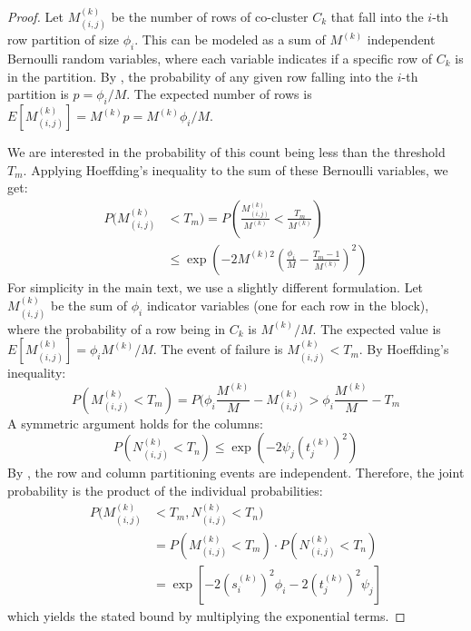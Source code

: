 \documentclass[journal]{IEEEtran}
\theoremstyle{definition}
\theoremstyle{remark} %
\begin{document}
{\color{blue}
\begin{proof}
    Let $M_{(i,j)}^{(k)}$ be the number of rows of co-cluster $C_k$ that fall into the $i$-th row partition of size $\phi_i$. This can be modeled as a sum of $M^{(k)}$ independent Bernoulli random variables, where each variable indicates if a specific row of $C_k$ is in the partition. By , the probability of any given row falling into the $i$-th partition is $p = \phi_i / M$. The expected number of rows is $E[M_{(i,j)}^{(k)}] = M^{(k)} p = M^{(k)} \phi_i / M$.

    We are interested in the probability of this count being less than the threshold $T_m$. Applying Hoeffding's inequality to the sum of these Bernoulli variables, we get:
    \begin{equation}
        \begin{aligned}
            P(M_{(i,j)}^{(k)} &< T_m) = P\left(\frac{M_{(i,j)}^{(k)}}{M^{(k)}} < \frac{T_m}{M^{(k)}}\right) \\
            &\le \exp\left(-2 M^{(k)2} \left(\frac{\phi_i}{M} - \frac{T_m-1}{M^{(k)}}\right)^2 \right)
        \end{aligned}
    \end{equation}
    For simplicity in the main text, we use a slightly different formulation. Let $M_{(i,j)}^{(k)}$ be the sum of $\phi_i$ indicator variables (one for each row in the block), where the probability of a row being in $C_k$ is $M^{(k)}/M$. The expected value is $E[M_{(i,j)}^{(k)}] = \phi_i M^{(k)}/M$. The event of failure is $M_{(i,j)}^{(k)} < T_m$. By Hoeffding's inequality:
    \begin{equation}
        P(M_{(i,j)}^{(k)} < T_m) = P(\phi_i \frac{M^{(k)}}{M} - M_{(i,j)}^{(k)} > \phi_i \frac{M^{(k)}}{M} - T_m
    \end{equation}
    A symmetric argument holds for the columns:
    \begin{equation}
        P(N_{(i,j)}^{(k)} < T_n) \le \exp(-2 \psi_j (t_j^{(k)})^2)
    \end{equation}
    By , the row and column partitioning events are independent. Therefore, the joint probability is the product of the individual probabilities:
    \begin{equation}
        \begin{aligned}
            P(M_{(i,j)}^{(k)} &< T_m, N_{(i,j)}^{(k)} < T_n) \\
            &= P(M_{(i,j)}^{(k)} < T_m) \cdot P(N_{(i,j)}^{(k)} < T_n) \\
            &= \exp\left[-2 (s_i^{(k)})^2 \phi_i -2 (t_j^{(k)})^2 \psi_j\right]
        \end{aligned}
    \end{equation}
    which yields the stated bound by multiplying the exponential terms.
\end{proof}
}
\end{document}
